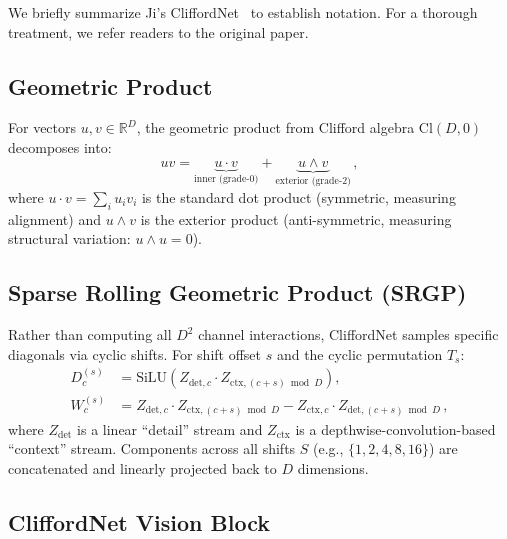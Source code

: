 \documentclass{article}
\newcommand{\R}{\mathbb{R}}
\newcommand{\Cl}{\mathrm{Cl}}
\newcommand{\silu}{\mathrm{SiLU}}
\begin{document}
We briefly summarize Ji's CliffordNet~\citep{ji2026cliffordnet} to establish notation. For a thorough treatment, we refer readers to the original paper.

\subsection{Geometric Product}

For vectors $u, v \in \R^D$, the geometric product from Clifford algebra $\Cl(D, 0)$ decomposes into:
\begin{equation}
  uv = \underbrace{u \cdot v}_{\text{inner (grade-0)}} + \underbrace{u \wedge v}_{\text{exterior (grade-2)}}\,,
  \label{eq:geometric}
\end{equation}
where $u \cdot v = \sum_i u_i v_i$ is the standard dot product (symmetric, measuring alignment) and $u \wedge v$ is the exterior product (anti-symmetric, measuring structural variation: $u \wedge u = 0$).

\subsection{Sparse Rolling Geometric Product (SRGP)}

Rather than computing all $D^2$ channel interactions, CliffordNet samples specific diagonals via cyclic shifts.
For shift offset $s$ and the cyclic permutation $T_s$:
\begin{align}
  D_c^{(s)} &= \silu\!\left(Z_{\text{det},c} \cdot Z_{\text{ctx},(c+s)\bmod D}\right), \label{eq:dot}\\
  W_c^{(s)} &= Z_{\text{det},c} \cdot Z_{\text{ctx},(c+s)\bmod D} - Z_{\text{ctx},c} \cdot Z_{\text{det},(c+s)\bmod D}\,, \label{eq:wedge}
\end{align}
where $Z_\text{det}$ is a linear ``detail'' stream and $Z_\text{ctx}$ is a depthwise-convolution-based ``context'' stream.
Components across all shifts $S$ (e.g., $\{1, 2, 4, 8, 16\}$) are concatenated and linearly projected back to $D$ dimensions.

\subsection{CliffordNet Vision Block}
\end{document}
